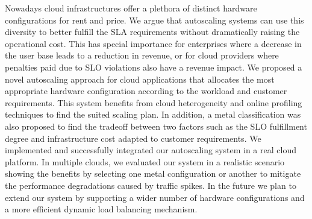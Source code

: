 
Nowadays cloud infrastructures offer a plethora of distinct hardware configurations for rent and price. We argue that autoscaling systems can use this diversity to better fulfill the SLA requirements without dramatically raising the operational cost. This has special importance for enterprises where a decrease in the user base leads to a reduction in revenue, or for cloud providers where penalties paid due to SLO violations also have a revenue impact. We proposed a novel autoscaling approach for cloud applications that allocates the most appropriate hardware configuration according to the workload and customer requirements. This system benefits from cloud heterogeneity and online profiling techniques to find the suited scaling plan. In addition, a metal classification was also proposed to find the tradeoff between two factors such as the SLO fulfillment degree and infrastructure cost adapted to customer requirements. We implemented and successfully integrated our autoscaling system in a real cloud platform. In multiple clouds, we evaluated our system in a realistic scenario showing the benefits by selecting one metal configuration or another to mitigate the performance degradations caused by traffic spikes. 
In the future we plan to extend our system by supporting a wider number of hardware configurations and a more efficient dynamic load balancing mechanism. %









